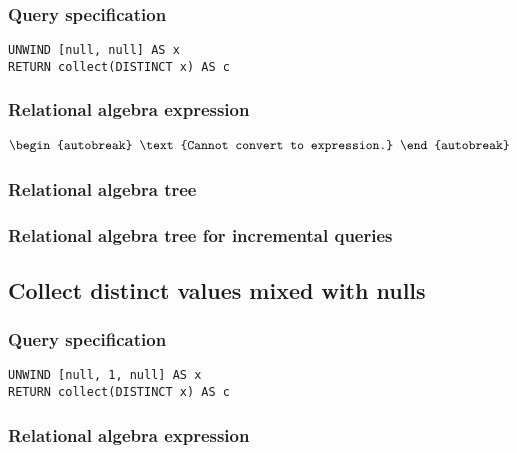 \subsubsection*{Query specification}

\begin{lstlisting}
UNWIND [null, null] AS x
RETURN collect(DISTINCT x) AS c
\end{lstlisting}

\subsubsection*{Relational algebra expression}

\begin{align*}
\begin{autobreak}
\text{Cannot convert to expression.}
\end{autobreak}
\end{align*}

\subsubsection*{Relational algebra tree}


\subsubsection*{Relational algebra tree for incremental queries}


\subsection{Collect distinct values mixed with nulls}

\subsubsection*{Query specification}

\begin{lstlisting}
UNWIND [null, 1, null] AS x
RETURN collect(DISTINCT x) AS c
\end{lstlisting}

\subsubsection*{Relational algebra expression}

